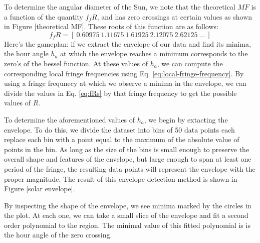 \documentclass[12pt]{article}
\begin{document}
To determine the angular diameter of the Sun, we note that the theoretical $MF$ is a function of the quantity $f_f R$, and has zero crossings at certain values as shown in Figure [theoretical MF]. These roots of this function are as follows:
\begin{equation}
f_f R = [ \ 0.60975\  1.11675\  1.61925 \ 2.12075\  2.62125\ \ldots\ ] \label{eq:fRs}
\end{equation}
Here's the gameplan: if we extract the envelope of our data and find its minima, the hour angle $h_a$ at which the envelope reaches a minimum corresponds to the zero's of the bessel function. At these values of $h_a$, we can compute the corresponding local fringe frequencies using Eq. \ref{eq:local-fringe-frequency}. By using a fringe frequnecy at which we observe a minima in the envelope, we can divide the values in Eq. \ref{eq:fRs} by that fringe frequency to get the possible values of $R$.

To determine the aforementioned values of $h_a$, we begin by extacting the envelope. To do this, we divide the dataset into bins of 50 data points each replace each bin with a point equal to the maximum of the absolute value of points in the bin. As long as the size of the bins is small enough to preserve the overall shape and features of the envelope, but large enough to span at least one period of the fringe, the resulting data points will represent the envelope with the proper magnitude. The result of this envelope detection method is shown in Figure [solar envelope].

By inspecting the shape of the envelope, we see minima marked by the circles in the plot. At each one, we can take a small slice of the envelope and fit a second order polynomial to the region. The minimal value of this fitted polynomial is is the hour angle of the zero crossing.
\end{document}

